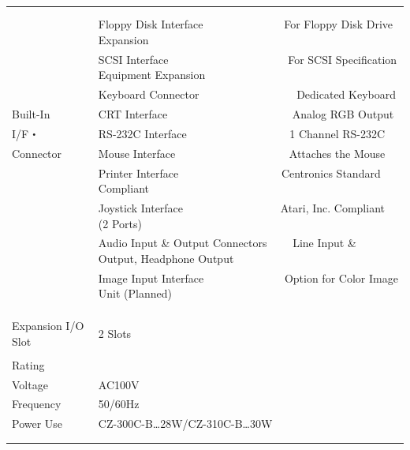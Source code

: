 \documentclass[twoside,a4paper,12pt]{article}
\begin{document}
\begin{tabular}{|p{17mm}|p{13mm}|p{23mm}|p{80mm}|p{30mm}|}
& \multicolumn{4}{l|}{}\\
\cline{2-5}
& \multicolumn{4}{l|}{}\\[-3mm]
& \multicolumn{4}{l|}{Floppy Disk Interface \ \ \ \ \ \ \ \ \ \ \ \ \ \ For Floppy Disk Drive Expansion}\\[2mm]
& \multicolumn{4}{l|}{SCSI Interface \ \ \ \ \ \ \ \ \ \ \ \ \ \ \ \ \ \ \ \ \ For SCSI Specification Equipment Expansion}\\[2mm]
& \multicolumn{4}{l|}{Keyboard Connector \ \ \ \ \ \ \ \ \ \ \ \ \ \ \ \ \ Dedicated Keyboard}\\
Built-In & \multicolumn{4}{l|}{CRT Interface \ \ \ \ \ \ \ \ \ \ \ \ \ \ \ \ \ \ \ \ \ \ Analog RGB Output}\\
I/F・ & \multicolumn{4}{l|}{RS-232C Interface \ \ \ \ \ \ \ \ \ \ \ \ \ \ \ \ \ \ 1 Channel RS-232C}\\
Connector & \multicolumn{4}{l|}{Mouse Interface \ \ \ \ \ \ \ \ \ \ \ \ \ \ \ \ \ \ \ \ Attaches the Mouse}\\
& \multicolumn{4}{l|}{Printer Interface \ \ \ \ \ \ \ \ \ \ \ \ \ \ \ \ \ \ Centronics Standard Compliant}\\
& \multicolumn{4}{l|}{Joystick Interface \ \ \ \ \ \ \ \ \ \ \ \ \ \ \ \ \ Atari, Inc. Compliant (2 Ports)}\\
& \multicolumn{4}{l|}{Audio Input \& Output Connectors \ \ \ \ Line Input \& Output, Headphone Output}\\
& \multicolumn{4}{l|}{Image Input Interface \ \ \ \ \ \ \ \ \ \ \ \ \ \ Option for Color Image Unit (Planned)}\\
& \multicolumn{4}{l|}{}\\
& \multicolumn{4}{l|}{}\\
\hline
\multicolumn{3}{|l|}{} & \multicolumn{2}{l|}{}\\[-3mm]
\multicolumn{3}{|l|}{Expansion I/O Slot} & \multicolumn{2}{l|}{2 Slots}\\
\hline
& \multicolumn{4}{l|}{}\\[-3mm]
Rating & \multicolumn{4}{l|}{}\\
Voltage & \multicolumn{4}{l|}{AC100V}\\
Frequency & \multicolumn{4}{l|}{50/60Hz}\\
Power Use & \multicolumn{4}{l|}{CZ-300C-B…28W/CZ-310C-B…30W}\\
& \multicolumn{4}{l|}{}\\
& \multicolumn{4}{l|}{}\\
\hline
\end{tabular}
\end{document}

